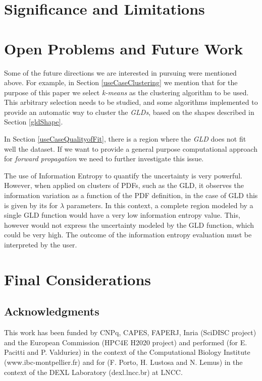 \section{Significance and Limitations}

\section{Open Problems and Future Work}
Some of the future directions we are interested in pursuing were mentioned above. For example, in Section \ref{useCaseClustering} we mention that for the purpose of this paper we select \textit{k-means} as the clustering algorithm to be used. This arbitrary selection needs to be studied, and some algorithms implemented to provide an automatic way to cluster the \textit{GLDs}, based on the shapes described in Section \ref{gldShape}.

In Section \ref{useCaseQualityofFit}, there is a region where the \textit{GLD} does not fit well the dataset. If we want to provide a general purpose computational approach for \textit{forward propagation} we need to further investigate this issue.

The use of Information Entropy to quantify the uncertainty is very powerful. However, when applied on clusters of PDFs, such as the GLD, it observes the information variation as a function of the PDF definition, in the case of GLD this is given by its for $\lambda$ parameters. In this context, a complete region modeled by a single GLD function would have a very low information entropy value. This, however would not express the uncertainty modeled by the GLD function, which could be very high. The outcome of the information entropy evaluation must be interpreted by the user. 

\section{Final Considerations}

\subsection*{Acknowledgments}
This work has been funded by CNPq, CAPES, FAPERJ, Inria (SciDISC project) and the European Commission (HPC4E H2020 project) and performed (for E. Pacitti and P. Valduriez) in the context of the Computational Biology Institute (www.ibc-montpellier.fr) and for (F. Porto, H. Lustosa and N. Lemus) in the context of the DEXL Laboratory (dexl.lncc.br)  at LNCC.
